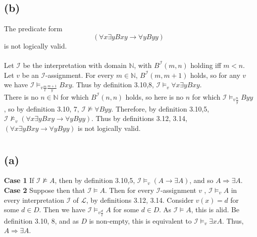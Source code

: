 \documentclass[11pt,oneside,a4paper]{article}
\newcommand{\iassv}{$\mathcal{I}$-assignment $v$ }
\newcommand{\ient}{\mathcal{I} \vDash_v}
\newcommand{\ii}{$\mathcal{I}$ }
\begin{document}
\subsection*{(b)}
The predicate form
$$(\forall x \exists y Bxy \to \forall y Byy)$$
is not logically valid.\\
\\
Let $\mathcal{I}$ be the interpretation with domain $\mathbb{N}$, with $B^\mathcal{I}(m,n)$ holding iff $m<n$. Let $v$ be an $\mathcal{I}$-assignment. For every $m \in \mathbb{N}$, $B^\mathcal{I}(m,m+1)$ holds, so for any $v$ we have $\mathcal{I} \vDash_{v \frac{m}{x} \frac{m+1}{y}} Bxy$. Thus by definition 3.10,8, $\mathcal{I} \vDash_v \forall x \exists y Bxy$.\\
There is no $n \in \mathbb{N}$ for which $B^\mathcal{I}(n,n)$ holds, so here is no $n$ for which $\mathcal{I} \vDash_{v \frac{n}{y}}Byy$, so by definition 3.10, 7, $\mathcal{I} \nvDash \forall Byy$. Therefore, by definition 3.10,5, $\mathcal{I} \nvDash_v (\forall x \exists y Bxy \to \forall y Byy)$. Thus by definitions 3.12, 3.14, $(\forall x \exists y Bxy \to \forall y Byy)$ is not logically valid.

\section{}
\subsection*{(a)}
\textbf{Case 1} \quad If $\mathcal{I} \nvDash A$, then by definition 3.10,5, $\mathcal{I} \vDash_v (A \to \exists A)$, and so $A \Rightarrow \exists A$.\\
\textbf{Case 2} \quad Suppose then that $\mathcal{I} \vDash A$. Then for every \iassv,  $\ient A$ in every interpretation \ii of $\mathcal{L}$, by definitions 3.12, 3.14. Consider $v(x)=d$ for some $d \in D$. Then we have $\mathcal{I}\vDash_{v \frac{d}{x}} A$ for some $d \in D$. As $\mathcal{I} \vDash A$, this is alid. Be definition 3.10, 8, and as $D$ is non-empty, this is equivalent to $\ient \exists x A$. Thus, $A \Rightarrow \exists A$.
\end{document}
